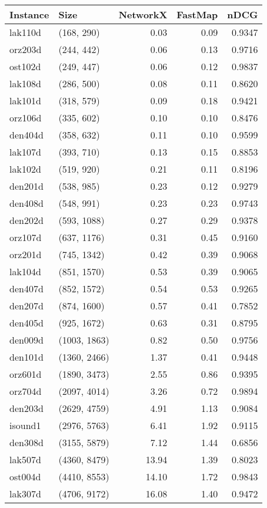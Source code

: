 \begin{tabular}{llrrr}
\toprule
Instance &         Size &  NetworkX &  FastMap &   nDCG \\
\midrule
 lak110d &   (168, 290) &      0.03 &     0.09 & 0.9347 \\
 orz203d &   (244, 442) &      0.06 &     0.13 & 0.9716 \\
 ost102d &   (249, 447) &      0.06 &     0.12 & 0.9837 \\
 lak108d &   (286, 500) &      0.08 &     0.11 & 0.8620 \\
 lak101d &   (318, 579) &      0.09 &     0.18 & 0.9421 \\
 orz106d &   (335, 602) &      0.10 &     0.10 & 0.8476 \\
 den404d &   (358, 632) &      0.11 &     0.10 & 0.9599 \\
 lak107d &   (393, 710) &      0.13 &     0.15 & 0.8853 \\
 lak102d &   (519, 920) &      0.21 &     0.11 & 0.8196 \\
 den201d &   (538, 985) &      0.23 &     0.12 & 0.9279 \\
 den408d &   (548, 991) &      0.23 &     0.23 & 0.9743 \\
 den202d &  (593, 1088) &      0.27 &     0.29 & 0.9378 \\
 orz107d &  (637, 1176) &      0.31 &     0.45 & 0.9160 \\
 orz201d &  (745, 1342) &      0.42 &     0.39 & 0.9068 \\
 lak104d &  (851, 1570) &      0.53 &     0.39 & 0.9065 \\
 den407d &  (852, 1572) &      0.54 &     0.53 & 0.9265 \\
 den207d &  (874, 1600) &      0.57 &     0.41 & 0.7852 \\
 den405d &  (925, 1672) &      0.63 &     0.31 & 0.8795 \\
 den009d & (1003, 1863) &      0.82 &     0.50 & 0.9756 \\
 den101d & (1360, 2466) &      1.37 &     0.41 & 0.9448 \\
 orz601d & (1890, 3473) &      2.55 &     0.86 & 0.9395 \\
 orz704d & (2097, 4014) &      3.26 &     0.72 & 0.9894 \\
 den203d & (2629, 4759) &      4.91 &     1.13 & 0.9084 \\
 isound1 & (2976, 5763) &      6.41 &     1.92 & 0.9115 \\
 den308d & (3155, 5879) &      7.12 &     1.44 & 0.6856 \\
 lak507d & (4360, 8479) &     13.94 &     1.39 & 0.8023 \\
 ost004d & (4410, 8553) &     14.10 &     1.72 & 0.9843 \\
 lak307d & (4706, 9172) &     16.08 &     1.40 & 0.9472 \\
\bottomrule
\end{tabular}
